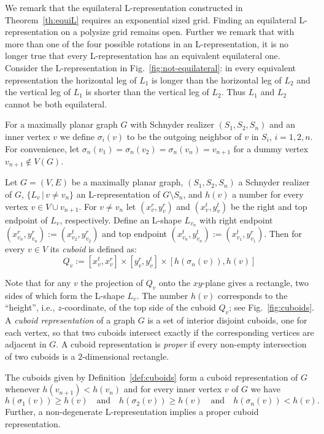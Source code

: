 \documentclass{llncs}
\begin{document}
We remark that the equilateral L-representation constructed in Theorem~\ref{th:equiL} requires an exponential sized grid. Finding an equilateral L-representation on a polysize grid remains open. Further we remark that with more than one of the four possible rotations in an L-representation, it is no longer true that every L-representation has an equivalent equilateral one. Consider the L-representation in Fig.~\ref{fig:not-equilateral}: in every equivalent representation the horizontal leg of $L_1$ is longer than the horizontal leg of $L_2$ and the vertical leg of $L_1$ is shorter than the vertical leg of $L_2$. Thus $L_1$ and $L_2$ cannot be both equilateral.


For a maximally planar graph $G$ with Schnyder realizer $(S_1,S_2,S_n)$ and an inner vertex $v$ we define $\sigma_i(v)$ to be the outgoing neighbor of $v$ in $S_i$, $i=1,2,n$. For convenience, let $\sigma_n(v_1) = \sigma_n(v_2) = \sigma_n(v_n) = v_{n+1}$ for a dummy vertex $v_{n+1} \notin V(G)$.

\begin{definition}\label{def:cuboids}
 Let $G = (V,E)$ be a maximally planar graph, $(S_1,S_2,S_n)$ a Schnyder realizer of $G$, $\{L_v \,|\, v \neq v_n\}$ an L-representation of $G \setminus S_n$, and $h(v)$ a number for every vertex $v \in V \cup v_{n+1}$. For $v \neq v_n$ let $(x^r_v,y^r_v)$ and $(x^t_v,y^t_v)$ be the right and top endpoint of $L_v$, respectively. Define an L-shape $L_{v_n}$ with right endpoint $(x^r_{v_n},y^r_{v_n}) := (x^t_{v_2},y^r_{v_2})$ and top endpoint $(x^t_{v_n},y^t_{v_n}) := (x^t_{v_1},y^r_{v_1})$. Then for every $v \in V$ its \emph{cuboid} is defined as:
 $$Q_{v} := [x^t_v,x^r_v] \times [y^r_v,y^t_v] \times [h(\sigma_n(v)),h(v)]$$
\end{definition}

Note that for any $v$ the projection of $Q_v$ onto the $xy$-plane gives a rectangle, two sides of which form the L-shape $L_v$. The number $h(v)$ corresponds to the ``height'', i.e., $z$-coordinate, of the top side of the cuboid $Q_v$; see Fig.~\ref{fig:cuboids}. A \emph{cuboid representation} of a graph $G$ is a set of interior disjoint cuboids, one for each vertex, so that two cuboids intersect exactly if the corresponding vertices are adjacent in $G$. A cuboid representation is \emph{proper} if every non-empty intersection of two cuboids is a $2$-dimensional rectangle.



\begin{proposition}\label{prop:cuboids}
 The cuboids given by Definition~\ref{def:cuboids} form a cuboid representation of $G$ whenever $h(v_{n+1}) < h(v_n)$ and for every inner vertex $v$ of $G$ we have
 \begin{equation}
  h(\sigma_1(v)) \geq h(v) \quad\text{and}\quad h(\sigma_2(v)) \geq h(v) \quad\text{and}\quad h(\sigma_n(v)) < h(v).\label{eq:h-values}
 \end{equation}
Further, a non-degenerate L-representation implies a proper cuboid representation.
\end{proposition}
\end{document}
